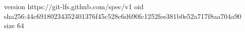 version https://git-lfs.github.com/spec/v1
oid sha256:44c69180234352401376f45c528c6d690fc1252fee381b0e52a717f8aa704a90
size 64
